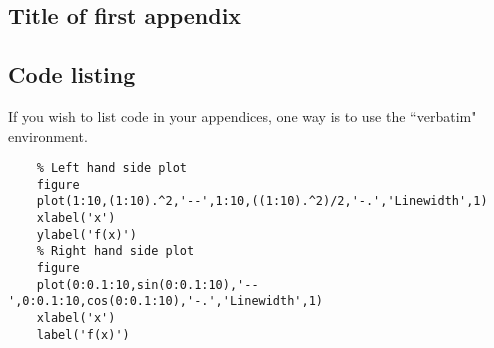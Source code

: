 \begin{appendices}
    \chapter{Title of first appendix}
    \section{Code listing}
    If you wish to list code in your appendices, one way is to use the ``verbatim" environment.
    
    \begin{verbatim}
    % Left hand side plot
    figure
    plot(1:10,(1:10).^2,'--',1:10,((1:10).^2)/2,'-.','Linewidth',1)
    xlabel('x')
    ylabel('f(x)')
    % Right hand side plot
    figure
    plot(0:0.1:10,sin(0:0.1:10),'--',0:0.1:10,cos(0:0.1:10),'-.','Linewidth',1)
    xlabel('x')
    label('f(x)')
    \end{verbatim}
    
\end{appendices}

